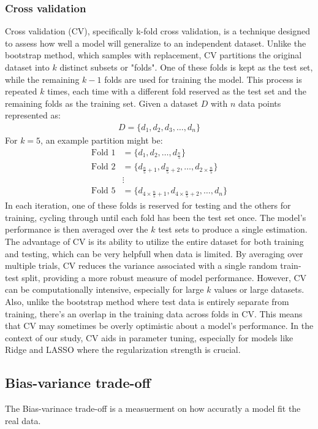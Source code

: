 \subsubsection{Cross validation}
\noindent Cross validation (CV), specifically k-fold cross validation, is a technique designed to assess how well a model will generalize to an independent dataset. Unlike the bootstrap method, which samples with replacement, CV partitions the original dataset into \(k\) distinct subsets or "folds". One of these folds is kept as the test set, while the remaining \(k-1\) folds are used for training the model. This process is repeated \(k\) times, each time with a different fold reserved as the test set and the remaining folds as the training set. Given a dataset \(D\) with \(n\) data points represented as:
\begin{align}
    D = \{d_1, d_2, d_3, \dots, d_n\}
\end{align}
For \(k=5\), an example partition might be:
\begin{align}
    \text{Fold 1} &= \{d_1, d_2, \dots, d_{\frac{n}{5}}\} \\
    \text{Fold 2} &= \{d_{\frac{n}{5}+1}, d_{\frac{n}{5}+2}, \dots, d_{2 \times \frac{n}{5}}\} \\
    &\vdots \\
    \text{Fold 5} &= \{d_{4 \times \frac{n}{5}+1}, d_{4 \times \frac{n}{5}+2}, \dots, d_n\}
\end{align}
In each iteration, one of these folds is reserved for testing and the others for training, cycling through until each fold has been the test set once. The model's performance is then averaged over the \(k\) test sets to produce a single estimation.
The advantage of CV is its ability to utilize the entire dataset for both training and testing, which can be very helpfull when data is limited. By averaging over multiple trials, CV reduces the variance associated with a single random train-test split, providing a more robust measure of model performance.
However, CV can be computationally intensive, especially for large \(k\) values or large datasets. Also, unlike the bootstrap method where test data is entirely separate from training, there's an overlap in the training data across folds in CV. This means that CV may sometimes be overly optimistic about a model's performance.
In the context of our study, CV aids in parameter tuning, especially for models like Ridge and LASSO where the regularization strength is crucial.




\subsection{Bias-variance trade-off}
The Bias-varinace trade-off is a measuerment on how accuratly a model fit the real data.

